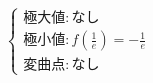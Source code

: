 \documentclass[fleqn]{jsarticle}
\begin{document}
\begin{description}
\begin{multicols}{2}
            $ \left\{
                    \begin{array}{l}
                        極大値 : なし \\
                        極小値 : f\left(\frac{1}{e}\right) = -\frac{1}{e} \\
                        変曲点 : なし
                    \end{array}
            \right. $

        \end{multicols}

    \end{description}
\end{document}
